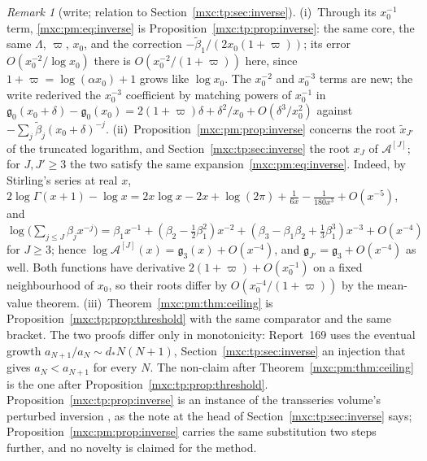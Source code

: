 \documentclass[11pt]{article}
\numberwithin{equation}{section}
\theoremstyle{definition}
\theoremstyle{remark}
\newtheorem{remark}[theorem]{Remark}
\begin{document}
\begin{remark}[write; relation to Section~\ref{mxc:tp:sec:inverse}]\label{mxc:pm:rem:inverse}
(i)~Through its $x_0^{-1}$ term, \eqref{mxc:pm:eq:inverse} is
Proposition~\ref{mxc:tp:prop:inverse}: the same core, the same $\Lambda$,
$\varpi$, $x_0$, and the correction $-\widetilde\beta_1/(2x_0(1+\varpi))$; its
error $O(x_0^{-2}/\log x_0)$ there is $O(x_0^{-2}/(1+\varpi))$ here, since
$1+\varpi=\log(\alpha x_0)+1$ grows like $\log x_0$. The $x_0^{-2}$ and
$x_0^{-3}$ terms are new; the write rederived the $x_0^{-3}$ coefficient by
matching powers of $x_0^{-1}$ in $\mathfrak g_0(x_0+\delta)-\mathfrak
g_0(x_0)=2(1+\varpi)\delta+\delta^2/x_0+O(\delta^3/x_0^2)$ against
$-\sum_j\widetilde\beta_j(x_0+\delta)^{-j}$. (ii)~Proposition~\ref{mxc:pm:prop:inverse}
concerns the root $\widetilde x_{J'}$ of the truncated logarithm, and
Section~\ref{mxc:tp:sec:inverse} the root $x_J$ of $\mathcal A^{[J]}$; for
$J,J'\ge3$ the two satisfy the same expansion~\eqref{mxc:pm:eq:inverse}.
Indeed, by Stirling's series at real $x$,
$2\log\Gamma(x+1)-\log x=2x\log x-2x+\log(2\pi)+\frac1{6x}-\frac1{180x^3}+O(x^{-5})$,
and $\log\bigl(\sum_{j\le J}\beta_jx^{-j}\bigr)=\beta_1x^{-1}+(\beta_2-\frac12\beta_1^2)x^{-2}
+(\beta_3-\beta_1\beta_2+\frac13\beta_1^3)x^{-3}+O(x^{-4})$ for $J\ge3$; hence
$\log\mathcal A^{[J]}(x)=\mathfrak g_3(x)+O(x^{-4})$, and
$\mathfrak g_{J'}=\mathfrak g_3+O(x^{-4})$ as well. Both functions have
derivative $2(1+\varpi)+O(x_0^{-1})$ on a fixed neighbourhood of $x_0$, so
their roots differ by $O(x_0^{-4}/(1+\varpi))$ by the mean-value theorem.
(iii)~Theorem~\ref{mxc:pm:thm:ceiling} is
Proposition~\ref{mxc:tp:prop:threshold} with the same comparator and the
same bracket. The two proofs differ only in monotonicity: Report~169 uses the
eventual growth $a_{N+1}/a_N\sim d_*N(N+1)$, Section~\ref{mxc:tp:sec:inverse}
an injection that gives $a_N<a_{N+1}$ for every $N$. The non-claim after
Theorem~\ref{mxc:pm:thm:ceiling} is the one after
Proposition~\ref{mxc:tp:prop:threshold}. Proposition~\ref{mxc:tp:prop:inverse}
is an instance of the transseries volume's perturbed inversion
\cite{tsvol}, as the note at the head of Section~\ref{mxc:tp:sec:inverse}
says; Proposition~\ref{mxc:pm:prop:inverse} carries the same substitution two
steps further, and no novelty is claimed for the method.
\end{remark}
\end{document}
